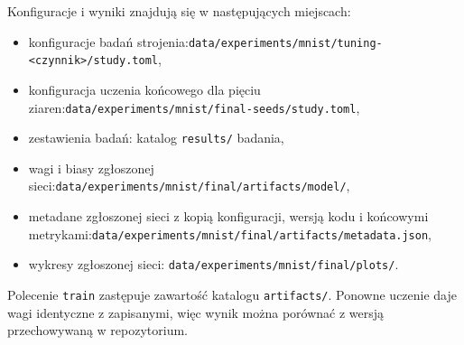 Konfiguracje i wyniki znajdują się w następujących miejscach:
\begin{itemize}
    \item konfiguracje badań strojenia:\newline \texttt{data/experiments/mnist/tuning-<czynnik>/study.toml},
    \item konfiguracja uczenia końcowego dla pięciu ziaren:\newline \texttt{data/experiments/mnist/final-seeds/study.toml},
    \item zestawienia badań: katalog \texttt{results/} badania,
    \item wagi i biasy zgłoszonej sieci:\newline \texttt{data/experiments/mnist/final/artifacts/model/},
    \item metadane zgłoszonej sieci z kopią konfiguracji, wersją kodu i końcowymi metrykami:\newline \texttt{data/experiments/mnist/final/artifacts/metadata.json},
    \item wykresy zgłoszonej sieci: \texttt{data/experiments/mnist/final/plots/}.
\end{itemize}

\noindent
Polecenie \texttt{train} zastępuje zawartość katalogu \texttt{artifacts/}. Ponowne uczenie daje wagi identyczne z zapisanymi, więc wynik można porównać z wersją przechowywaną w repozytorium.
